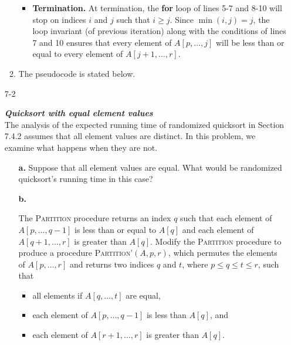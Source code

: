 \begin{enumerate}
\begin{framed}
\begin{enumerate}
{\begin{itemize}
$A[j] \le x$, we have $A[i] \ge A[j]$. To go to the next iteration line 11
must be valid and the exchange of $A[i]$ with $A[j]$ at line 12 maintains the
loop invariant.
\item \textbf{Termination.} At termination, the \textbf{for} loop of lines 5-7
and 8-10 will stop on indices $i$ and $j$ such that $i \ge j$. Since
$\min(i, j) = j$, the loop invariant (of previous iteration) along with the
conditions of lines 7 and 10 ensures that every element of $A[p, \dots, j]$
  will be less than or equal to every element of $A[j + 1, \dots, r]$.
\end{itemize}
}
\item{The pseudocode is stated below.

\begin{algorithm}[H]
\SetAlgoNoEnd\DontPrintSemicolon
\BlankLine
{}
\nonl{}
\end{algorithm}
}
\end{enumerate}
\end{framed}

\newpage

\item[7{-}2]{\textbf{\emph{Quicksort with equal element values}}\\
The analysis of the expected running time of randomized quicksort in Section
7.4.2 assumes that all element values are distinct. In this problem, we examine
what happens when they are not.

\begin{enumerate}
\item[\textbf{a.}]{Suppose that all element values are equal. What would be
randomized quicksort's running time in this case?}

\item[\textbf{b.}]{The \textsc{Partition} procedure returns an index $q$ such
that each element of $A[p, \dots, q - 1]$ is less than or equal to $A[q]$ and
each element of $A[q + 1, \dots, r]$ is greater than $A[q]$. Modify the
\textsc{Partition} procedure to produce a procedure
\textsc{Partition'}$(A, p, r)$, which permutes the elements of $A[p, \dots, r]$
and returns two indices $q$ and $t$, where $p \le q \le t \le r$, such that
\begin{itemize}
\item{all elements if $A[q, \dots, t]$ are equal,}
\item{each element of $A[p, \dots, q - 1]$ is less than $A[q]$, and}
\item{each element of $A[r + 1, \dots, r]$ is greater than $A[q]$.}
\end{itemize}

}
\end{enumerate}}
\end{enumerate}
